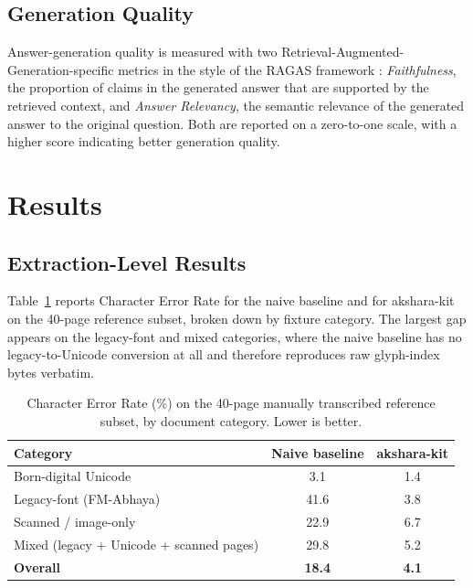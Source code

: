 \documentclass[12pt,a4paper,oneside]{report}
\begin{document}
\subsection{Generation Quality}
Answer-generation quality is measured with two Retrieval-Augmented-Generation-specific metrics in the style of the RAGAS framework \cite{es2023ragas}: \textit{Faithfulness}, the proportion of claims in the generated answer that are supported by the retrieved context, and \textit{Answer Relevancy}, the semantic relevance of the generated answer to the original question. Both are reported on a zero-to-one scale, with a higher score indicating better generation quality.

\section{Results}
\label{sec:eval-results}

\subsection{Extraction-Level Results}
\label{sec:eval-extraction-results}
Table~\ref{tab:eval-cer} reports Character Error Rate for the naive baseline and for akshara-kit on the 40-page reference subset, broken down by fixture category. The largest gap appears on the legacy-font and mixed categories, where the naive baseline has no legacy-to-Unicode conversion at all and therefore reproduces raw glyph-index bytes verbatim.

\begin{table}[h]
\centering
\caption{Character Error Rate (\%) on the 40-page manually transcribed reference subset, by document category. Lower is better.}
\label{tab:eval-cer}
\renewcommand{\arraystretch}{1.25}
\begin{tabularx}{\textwidth}{X c c}
\hline
\textbf{Category} & \textbf{Naive baseline} & \textbf{akshara-kit} \\
\hline
Born-digital Unicode & 3.1 & 1.4 \\
\hline
Legacy-font (FM-Abhaya) & 41.6 & 3.8 \\
\hline
Scanned / image-only & 22.9 & 6.7 \\
\hline
Mixed (legacy + Unicode + scanned pages) & 29.8 & 5.2 \\
\hline
\textbf{Overall} & \textbf{18.4} & \textbf{4.1} \\
\hline
\end{tabularx}
\end{table}
\end{document}
